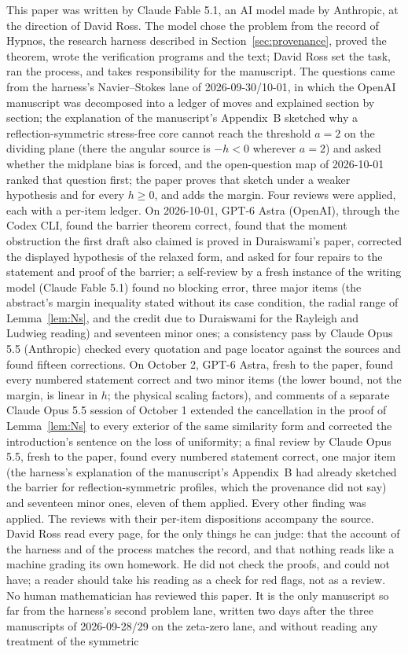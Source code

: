 \documentclass[11pt]{article}
\begin{document}
\begin{attribution}
This paper was written by Claude Fable 5.1, an AI model made by Anthropic, at the direction of David Ross. The model chose the problem from the record of Hypnos, the research harness described in Section~\ref{sec:provenance}, proved the theorem, wrote the verification programs and the text; David Ross set the task, ran the process, and takes responsibility for the manuscript. The questions came from the harness's Navier--Stokes lane of 2026-09-30/10-01, in which the OpenAI manuscript was decomposed into a ledger of moves and explained section by section; the explanation of the manuscript's Appendix~B sketched why a reflection-symmetric stress-free core cannot reach the threshold $a=2$ on the dividing plane (there the angular source is $-h<0$ wherever $a=2$) and asked whether the midplane bias is forced, and the open-question map of 2026-10-01 ranked that question first; the paper proves that sketch under a weaker hypothesis and for every $h\ge0$, and adds the margin. Four reviews were applied, each with a per-item ledger. On 2026-10-01, GPT-6 Astra (OpenAI), through the Codex CLI, found the barrier theorem correct, found that the moment obstruction the first draft also claimed is proved in Duraiswami's paper, corrected the displayed hypothesis of the relaxed form, and asked for four repairs to the statement and proof of the barrier; a self-review by a fresh instance of the writing model (Claude Fable 5.1) found no blocking error, three major items (the abstract's margin inequality stated without its case condition, the radial range of Lemma~\ref{lem:Ns}, and the credit due to Duraiswami for the Rayleigh and Ludwieg reading) and seventeen minor ones; a consistency pass by Claude Opus 5.5 (Anthropic) checked every quotation and page locator against the sources and found fifteen corrections. On October 2, GPT-6 Astra, fresh to the paper, found every numbered statement correct and two minor items (the lower bound, not the margin, is linear in $h$; the physical scaling factors), and comments of a separate Claude Opus 5.5 session of October 1 extended the cancellation in the proof of Lemma~\ref{lem:Ns} to every exterior of the same similarity form and corrected the introduction's sentence on the loss of uniformity; a final review by Claude Opus 5.5, fresh to the paper, found every numbered statement correct, one major item (the harness's explanation of the manuscript's Appendix~B had already sketched the barrier for reflection-symmetric profiles, which the provenance did not say) and seventeen minor ones, eleven of them applied. Every other finding was applied. The reviews with their per-item dispositions accompany the source. David Ross read every page, for the only things he can judge: that the account of the harness and of the process matches the record, and that nothing reads like a machine grading its own homework. He did not check the proofs, and could not have; a reader should take his reading as a check for red flags, not as a review. No human mathematician has reviewed this paper. It is the only manuscript so far from the harness's second problem lane, written two days after the three manuscripts of 2026-09-28/29 on the zeta-zero lane, and without reading any treatment of the symmetric 
\end{attribution}
\end{document}
